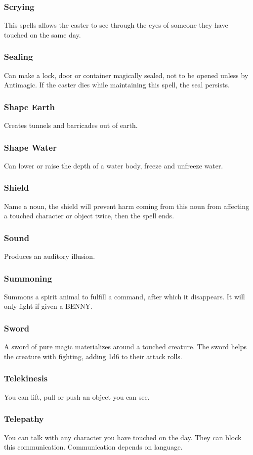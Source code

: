 \begin{multicols}{3}
\subsubsection*{Scrying}
This spells allows the caster to see through the eyes of someone they have touched on the same day.
\subsubsection*{Sealing}
Can make a lock, door or container magically sealed, not to be opened unless by Antimagic. If the caster dies while maintaining this spell, the seal persists.
\subsubsection*{Shape Earth}
Creates tunnels and barricades out of earth.
\subsubsection*{Shape Water}
Can lower or raise the depth of a water body, freeze and unfreeze water.
\subsubsection*{Shield}
Name a noun, the shield will prevent harm coming from this noun from affecting a touched character or object twice, then the spell ends.
\subsubsection*{Sound}
Produces an auditory illusion.
\subsubsection*{Summoning}
Summons a spirit animal to fulfill a command, after which it disappears. It will only fight if given a BENNY.
\subsubsection*{Sword}
A sword of pure magic materializes around a touched creature. The sword helps the creature with fighting, adding 1d6 to their attack rolls.
\subsubsection*{Telekinesis}
You can lift, pull or push an object you can see.
\subsubsection*{Telepathy}
You can talk with any character you have touched on the day. They can block this communication. Communication depends on language.

\end{multicols}
